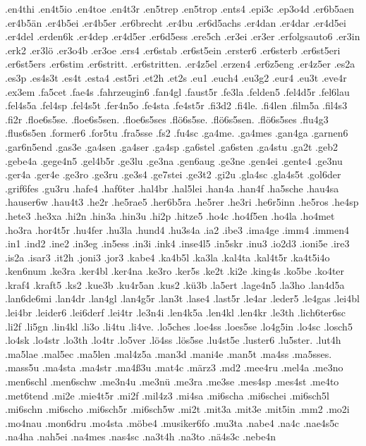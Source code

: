 {.en4thi
.en4t5io
.en4toe
.en4t3r
.en5trep
.en5trop
.ents4
.epi3c
.ep3o4d
.er6b5aen
.er4b5än
.er4b5ei
.er4b5er
.er6brecht
.er4bu
.er6d5achs
.er4dan
.er4dar
.er4d5ei
.er4del
.erden6k
.er4dep
.er4d5er
.er6d5ess
.ere5ch
.er3ei
.er3er
.erfolgsauto6
.er3in
.erk2
.er3lö
.er3o4b
.er3oe
.ers4
.er6stab
.er6st5ein
.erster6
.er6sterb
.er6st5eri
.er6st5ers
.er6stim
.er6stritt.
.er6stritten.
.er4z5el
.erzen4
.er6z5eng
.er4z5er
.es2a
.es3p
.es4s3t
.es4t
.esta4
.est5ri
.et2h
.et2s
.eu1
.euch4
.eu3g2
.eur4
.eu3t
.eve4r
.ex3em
.fa5cet
.fae4s
.fahrzeugin6
.fan4gl
.faust5r
.fe3la
.felden5
.fel4d5r
.fel6lau
.fel4s5a
.fel4sp
.fel4s5t
.fer4n5o
.fe4sta
.fe4st5r
.fi3d2
.fi4le.
.fi4len
.film5a
.fil4s3
.fi2r
.floe6s5se.
.floe6s5sen.
.floe6s5ses
.flö6s5se.
.flö6s5sen.
.flö6s5ses
.flu4g3
.flus6s5en
.former6
.for5tu
.fra5sse
.fs2
.fu4sc
.ga4me.
.ga4mes
.gan4ga
.garnen6
.gar6n5end
.gas3e
.ga4sen
.ga4ser
.ga4sp
.ga6stel
.ga6sten
.ga4stu
.ga2t
.geb2
.gebe4a
.gege4n5
.gel4b5r
.ge3lu
.ge3na
.gen6aug
.ge3ne
.gen4ei
.gente4
.ge3nu
.ger4a
.ger4e
.ge3ro
.ge3ru
.ge3s4
.ge7stei
.ge3t2
.gi2u
.gla4sc
.gla4s5t
.gol6der
.grif6fes
.gu3ru
.hafe4
.haf6ter
.hal4br
.hal5lei
.han4a
.han4f
.ha5sche
.hau4sa
.hauser6w
.hau4t3
.he2r
.he5rae5
.her6b5ra
.he5rer
.he3ri
.he6r5inn
.he5ros
.he4sp
.hete3
.he3xa
.hi2n
.hin3a
.hin3u
.hi2p
.hitze5
.ho4c
.ho4f5en
.ho4la
.ho4met
.ho3ra
.hor4t5r
.hu4fer
.hu3la
.hund4
.hu3s4a
.ia2
.ibe3
.ima4ge
.imm4
.immen4
.in1
.ind2
.ine2
.in3eg
.in5ess
.in3i
.ink4
.inse4l5
.in5skr
.inu3
.io2d3
.ioni5e
.ire3
.is2a
.isar3
.it2h
.joni3
.jor3
.kabe4
.ka4b5l
.ka3la
.kal4ta
.kal4t5r
.ka4t5i4o
.ken6num
.ke3ra
.ker4bl
.ker4na
.ke3ro
.ker5s
.ke2t
.ki2e
.king4s
.ko5be
.ko4ter
.kraf4
.kraft5
.ks2
.kue3b
.ku4r5an
.kus2
.kü3b
.la5ert
.lage4n5
.la3ho
.lan4d5a
.lan6de6mi
.lan4dr
.lan4gl
.lan4g5r
.lan3t
.lase4
.last5r
.le4ar
.leder5
.le4gas
.lei4bl
.lei4br
.leider6
.lei6derf
.lei4tr
.le3n4i
.len4k5a
.len4kl
.len4kr
.le3th
.lich6ter6sc
.li2f
.li5gn
.lin4kl
.li3o
.li4tu
.li4ve.
.lo5ches
.loe4ss
.loes5se
.lo4g5in
.lo4sc
.losch5
.lo4sk
.lo4str
.lo3th
.lo4tr
.lo5ver
.lö4ss
.lös5se
.lu4st5e
.luster6
.lu5ster.
.lut4h
.ma5lae
.mal5ec
.ma5len
.mal4z5a
.man3d
.mani4e
.man5t
.ma4ss
.ma5sses.
.mass5u
.ma4sta
.ma4str
.ma4ß3u
.mat4c
.märz3
.md2
.mee4ru
.mel4a
.me3no
.men6schl
.men6schw
.me3n4u
.me3nü
.me3ra
.me3se
.mes4sp
.mes4st
.me4to
.met6tend
.mi2e
.mie4t5r
.mi2f
.mil4z3
.mi4sa
.mi6scha
.mi6schei
.mi6sch5l
.mi6schn
.mi6scho
.mi6sch5r
.mi6sch5w
.mi2t
.mit3a
.mit3e
.mit5in
.mm2
.mo2i
.mo4nau
.mon6dru
.mo4sta
.möbe4
.musiker6fo
.mu3ta
.nabe4
.na4c
.nae4s5c
.na4ha
.nah5ei
.na4mes
.nas4sc
.na3t4h
.na3to
.nä4s3c
.nebe4n
}
